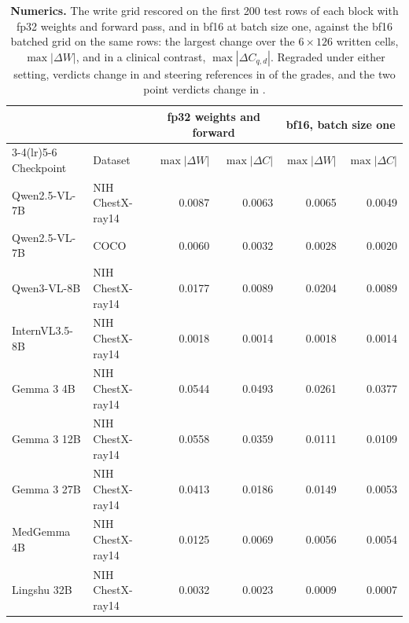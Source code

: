 \begin{table}[h]
\centering
\scriptsize
\setlength{\tabcolsep}{5pt}
\caption{\textbf{Numerics.} The write grid rescored on the first 200 test rows of each block with fp32 weights and forward pass, and in bf16 at batch size one, against the bf16 batched grid on the same rows: the largest change over the $6\times126$ written cells, $\max|\Delta W|$, and in a clinical contrast, $\max|\Delta C_{q,d}|$. Regraded under either setting, verdicts change in \cfPrecisionVerdictChanges{} and steering references in \cfPrecisionRefChanges{} of the \cfPrecisionGradeCells{} grades, and the two point verdicts change in \cfPrecisionPointVerdictChanges{}.}
\label{tab:cf-precision}
\begin{tabular}{llrrrr}
\toprule
 & & \multicolumn{2}{c}{fp32 weights and forward} & \multicolumn{2}{c}{bf16, batch size one} \\
\cmidrule(lr){3-4}\cmidrule(lr){5-6}
Checkpoint & Dataset & $\max|\Delta W|$ & $\max|\Delta C|$ & $\max|\Delta W|$ & $\max|\Delta C|$ \\
\midrule
Qwen2.5-VL-7B & NIH ChestX-ray14 & 0.0087 & 0.0063 & 0.0065 & 0.0049 \\
Qwen2.5-VL-7B & COCO & 0.0060 & 0.0032 & 0.0028 & 0.0020 \\
Qwen3-VL-8B & NIH ChestX-ray14 & 0.0177 & 0.0089 & 0.0204 & 0.0089 \\
InternVL3.5-8B & NIH ChestX-ray14 & 0.0018 & 0.0014 & 0.0018 & 0.0014 \\
Gemma 3 4B & NIH ChestX-ray14 & 0.0544 & 0.0493 & 0.0261 & 0.0377 \\
Gemma 3 12B & NIH ChestX-ray14 & 0.0558 & 0.0359 & 0.0111 & 0.0109 \\
Gemma 3 27B & NIH ChestX-ray14 & 0.0413 & 0.0186 & 0.0149 & 0.0053 \\
MedGemma 4B & NIH ChestX-ray14 & 0.0125 & 0.0069 & 0.0056 & 0.0054 \\
Lingshu 32B & NIH ChestX-ray14 & 0.0032 & 0.0023 & 0.0009 & 0.0007 \\
\bottomrule
\end{tabular}
\end{table}
